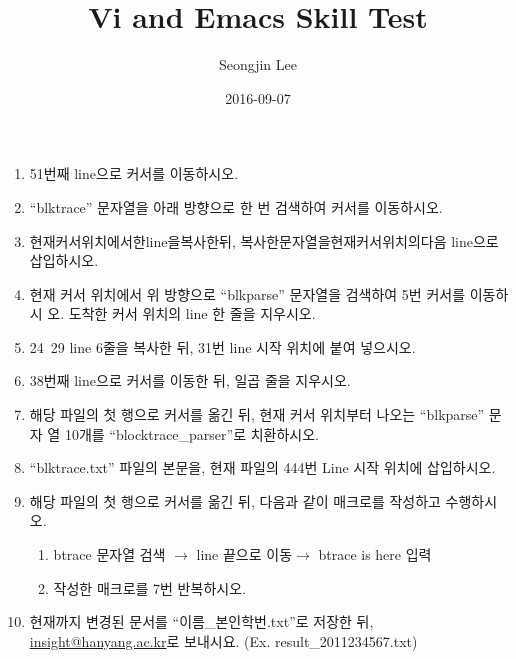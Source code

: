 \documentclass{article}
\title{Vi and Emacs Skill Test}
\author{Seongjin Lee}
\date{2016-09-07}
\begin{document}
\maketitle 

\noindent
{}

\begin{enumerate}
\item 51번째 line으로 커서를 이동하시오.
\item ``blktrace'' 문자열을 아래 방향으로 한 번 검색하여 커서를 이동하시오.
\item 현재커서위치에서한line을복사한뒤, 복사한문자열을현재커서위치의다음 line으로 삽입하시오.
\item 현재 커서 위치에서 위 방향으로 ``blkparse'' 문자열을 검색하여 5번 커서를 이동하시 오. 도착한 커서 위치의 line 한 줄을 지우시오.
\item 24~29 line 6줄을 복사한 뒤, 31번 line 시작 위치에 붙여 넣으시오.
\item 38번째 line으로 커서를 이동한 뒤, 일곱 줄을 지우시오.
\item 해당 파일의 첫 행으로 커서를 옮긴 뒤, 현재 커서 위치부터 나오는 ``blkparse'' 문자 열 10개를 ``blocktrace\_parser''로 치환하시오.
\item ``blktrace.txt'' 파일의 본문을, 현재 파일의 444번 Line 시작 위치에 삽입하시오.
\item 해당 파일의 첫 행으로 커서를 옮긴 뒤, 다음과 같이 매크로를 작성하고 수행하시오.
\begin{enumerate}
\item btrace 문자열 검색 $\rightarrow$ line 끝으로 이동$\rightarrow$ btrace is here 입력
\item 작성한 매크로를 7번 반복하시오.
\end{enumerate}
\item 현재까지 변경된 문서를 ``이름\_본인학번.txt''로 저장한 뒤, \href{mailto:insight@hanyang.ac.kr}{insight@hanyang.ac.kr}로 보내시요. (Ex. result\_2011234567.txt)
\end{enumerate}
\end{document}
